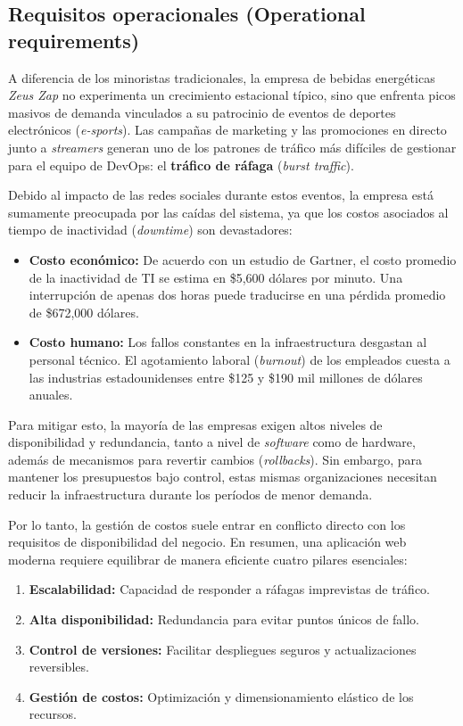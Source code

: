\subsection{Requisitos operacionales (Operational requirements)}

A diferencia de los minoristas tradicionales, la empresa de bebidas energéticas \textit{Zeus Zap} no experimenta un crecimiento estacional típico, sino que enfrenta picos masivos de demanda vinculados a su patrocinio de eventos de deportes electrónicos (\textit{e-sports}). Las campañas de marketing y las promociones en directo junto a \textit{streamers} generan uno de los patrones de tráfico más difíciles de gestionar para el equipo de DevOps: el \textbf{tráfico de ráfaga} (\textit{burst traffic}). 

Debido al impacto de las redes sociales durante estos eventos, la empresa está sumamente preocupada por las caídas del sistema, ya que los costos asociados al tiempo de inactividad (\textit{downtime}) son devastadores:

\begin{itemize}
    \item \textbf{Costo económico:} De acuerdo con un estudio de Gartner, el costo promedio de la inactividad de TI se estima en \$5,600 dólares por minuto. Una interrupción de apenas dos horas puede traducirse en una pérdida promedio de \$672,000 dólares.
    \item \textbf{Costo humano:} Los fallos constantes en la infraestructura desgastan al personal técnico. El agotamiento laboral (\textit{burnout}) de los empleados cuesta a las industrias estadounidenses entre \$125 y \$190 mil millones de dólares anuales.
\end{itemize}

Para mitigar esto, la mayoría de las empresas exigen altos niveles de disponibilidad y redundancia, tanto a nivel de \textit{software} como de hardware, además de mecanismos para revertir cambios (\textit{rollbacks}). Sin embargo, para mantener los presupuestos bajo control, estas mismas organizaciones necesitan reducir la infraestructura durante los períodos de menor demanda. 

Por lo tanto, la gestión de costos suele entrar en conflicto directo con los requisitos de disponibilidad del negocio. En resumen, una aplicación web moderna requiere equilibrar de manera eficiente cuatro pilares esenciales:
\begin{enumerate}
    \item \textbf{Escalabilidad:} Capacidad de responder a ráfagas imprevistas de tráfico.
    \item \textbf{Alta disponibilidad:} Redundancia para evitar puntos únicos de fallo.
    \item \textbf{Control de versiones:} Facilitar despliegues seguros y actualizaciones reversibles.
    \item \textbf{Gestión de costos:} Optimización y dimensionamiento elástico de los recursos.
\end{enumerate}

